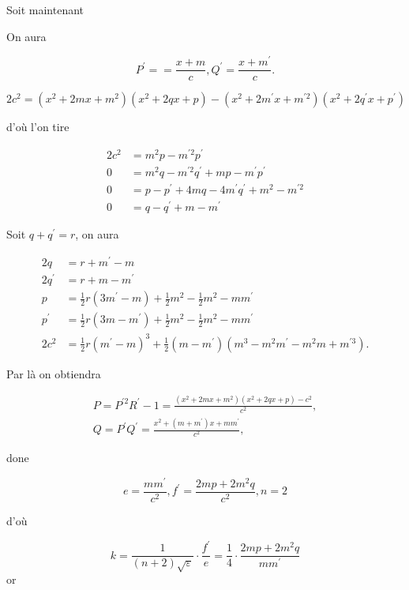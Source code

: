 \documentclass{article}
\begin{document}
Soit maintenant

On aura

\[
P^{\prime}==\frac{x+m}{c}, Q^{\prime}=\frac{x+m^{\prime}}{c} .
\]

\[
2 c^{2}=\left(x^{2}+2 m x+m^{2}\right)\left(x^{2}+2 q x+p\right)-\left(x^{2}+2 m^{\prime} x+m^{\prime 2}\right)\left(x^{2}+2 q^{\prime} x+p^{\prime}\right)
\]

d'où l'on tire

\[
\begin{aligned}
2 c^{2} & =m^{2} p-m^{\prime 2} p^{\prime} \\
0 & =m^{2} q-m^{\prime 2} q^{\prime}+m p-m^{\prime} p^{\prime} \\
0 & =p-p^{\prime}+4 m q-4 m^{\prime} q^{\prime}+m^{2}-m^{\prime 2} \\
0 & =q-q^{\prime}+m-m^{\prime}
\end{aligned}
\]

Soit \(q+q^{\prime}=r\), on aura

\[
\begin{aligned}
2 q & =r+m^{\prime}-m \\
2 q^{\prime} & =r+m-m^{\prime} \\
p & =\frac{1}{2} r\left(3 m^{\prime}-m\right)+\frac{1}{2} m^{2}-\frac{1}{2} m^{2}-m m^{\prime} \\
p^{\prime} & =\frac{1}{2} r\left(3 m-m^{\prime}\right)+\frac{1}{2} m^{2}-\frac{1}{2} m^{2}-m m^{\prime} \\
2 c^{2} & =\frac{1}{2} r\left(m^{\prime}-m\right)^{3}+\frac{1}{2}\left(m-m^{\prime}\right)\left(m^{3}-m^{2} m^{\prime}-m^{2} m+m^{\prime 3}\right) .
\end{aligned}
\]

Par là on obtiendra

\[
\begin{gathered}
P=P^{\prime 2} R^{\prime}-1=\frac{\left(x^{2}+2 m x+m^{2}\right)\left(x^{2}+2 q x+p\right)-c^{2}}{c^{2}}, \\
Q=P^{\prime} Q^{\prime}=\frac{x^{2}+\left(m+m^{\prime}\right) x+m m^{\prime}}{c^{2}},
\end{gathered}
\]

done

\[
e=\frac{m m^{\prime}}{c^{2}}, f^{\prime}=\frac{2 m p+2 m^{2} q}{c^{2}}, n=2
\]

d'où

\[
k=\frac{1}{(n+2) \sqrt{\varepsilon}} \cdot \frac{f^{\prime}}{e}=\frac{1}{4} \cdot \frac{2 m p+2 m^{2} q}{m m^{\prime}}
\]
or
\end{document}
